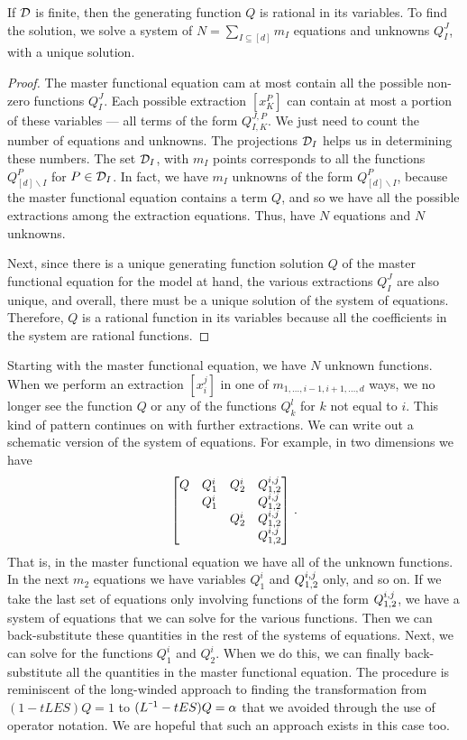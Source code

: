 \begin{thm} If $\mathcal{D}$ is finite, then the generating function $Q$ is rational in its variables. To find the solution, we solve a system of $N = \sum_{I\subseteq [d]} m_I$ equations and unknowns $Q_I^J$, with a unique solution.
\end{thm}
\begin{proof} The master functional equation cam at most contain all the possible non-zero functions $Q_I^J$. Each possible extraction $[x_K^P]$ can contain at most a portion of these variables --- all terms of the form $Q_{I,K}^{J,P}$. We just need to count the number of equations and unknowns. The projections $\mathcal{D}_I$ helps us in determining these numbers. The set $\mathcal{D}_I$, with $m_I$ points corresponds to all the functions $Q_{[d]\backslash I}^P$ for $P \in \mathcal{D}_I$. In fact, we have $m_I$ unknowns of the form $Q_{[d]\backslash I}^P$, because the master functional equation contains a term $Q$, and so we have all the possible extractions among the extraction equations.  Thus, have $N$ equations and $N$ unknowns.

Next, since there is a unique generating function solution $Q$ of the master functional equation for the model at hand, the various extractions $Q_I^J$ are also unique, and overall, there must be a unique solution of the system of equations. Therefore, $Q$ is a rational function in its variables because all the coefficients in the system are rational functions.
\end{proof}

Starting with the master functional equation, we have $N$ unknown functions. When we perform an extraction $[x_i^j]$ in one of $m_{1,\ldots,i-1,i + 1,\ldots,d}$ ways, we no longer see the function $Q$ or any of the functions $Q_k^l$ for $k$ not equal to $i$. This kind of pattern continues on with further extractions. We can write out a schematic version of the system of equations. For example, in two dimensions we have
\begin{align}
	\begin{bmatrix}
		Q & Q_1^i & Q_2 ^i & Q_{1,2}^{i,j}\\
		& Q_1^i & & Q_{1,2}^{i,j}\\
		& & Q_2^i & Q_{1,2}^{i,j}\\
		& & & Q_{1,2}^{i,j}
	\end{bmatrix}\,.
\end{align}
That is, in the master functional equation we have all of the unknown functions. In the next $m_2$ equations we have variables $Q_1^i$ and $Q_{1,2}^{i,j}$ only, and so on. If we take the last set of equations only involving functions of the form $Q_{1,2}^{i,j}$, we have a system of equations that we can solve for the various functions. Then we can back-substitute these quantities in the rest of the systems of equations. Next, we can solve for the functions $Q_1^i$ and $Q_2^i$. When we do this, we can finally back-substitute all the quantities in the master functional equation. The procedure is reminiscent of the long-winded approach to finding the transformation from $(1-tLES)Q = 1$ to $(L^{\um 1} - t ES)Q = \alpha$ that we avoided through the use of operator notation. We are hopeful that such an approach exists in this case too.

